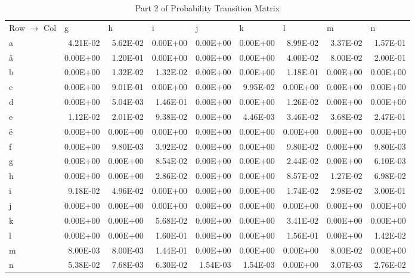 \documentclass[11pt,a4paper]{CLabBookTemplate} %
\begin{document}
\begin{table}[htbp]
	\centering
	\caption{Part 2 of Probability Transition Matrix}
	\begin{tabular}{lrrrrrrrr}
		Row $\rightarrow$ Col & \multicolumn{1}{l}{g} & \multicolumn{1}{l}{h} & \multicolumn{1}{l}{i} & \multicolumn{1}{l}{j} & \multicolumn{1}{l}{k} & \multicolumn{1}{l}{l} & \multicolumn{1}{l}{m} & \multicolumn{1}{l}{n} \\
		a     & 4.21E-02 & 5.62E-02 & 0.00E+00 & 0.00E+00 & 0.00E+00 & 8.99E-02 & 3.37E-02 & 1.57E-01 \\
		ä     & 0.00E+00 & 1.20E-01 & 0.00E+00 & 0.00E+00 & 0.00E+00 & 4.00E-02 & 8.00E-02 & 2.00E-01 \\
		b     & 0.00E+00 & 1.32E-02 & 1.32E-02 & 0.00E+00 & 0.00E+00 & 1.18E-01 & 0.00E+00 & 0.00E+00 \\
		c     & 0.00E+00 & 9.01E-01 & 0.00E+00 & 0.00E+00 & 9.95E-02 & 0.00E+00 & 0.00E+00 & 0.00E+00 \\
		d     & 0.00E+00 & 5.04E-03 & 1.46E-01 & 0.00E+00 & 0.00E+00 & 1.26E-02 & 0.00E+00 & 0.00E+00 \\
		e     & 1.12E-02 & 2.01E-02 & 9.38E-02 & 0.00E+00 & 4.46E-03 & 3.46E-02 & 3.68E-02 & 2.47E-01 \\
		ë     & 0.00E+00 & 0.00E+00 & 0.00E+00 & 0.00E+00 & 0.00E+00 & 0.00E+00 & 0.00E+00 & 0.00E+00 \\
		f     & 0.00E+00 & 9.80E-03 & 3.92E-02 & 0.00E+00 & 0.00E+00 & 9.80E-02 & 0.00E+00 & 9.80E-03 \\
		g     & 0.00E+00 & 0.00E+00 & 8.54E-02 & 0.00E+00 & 0.00E+00 & 2.44E-02 & 0.00E+00 & 6.10E-03 \\
		h     & 0.00E+00 & 0.00E+00 & 2.86E-02 & 0.00E+00 & 0.00E+00 & 8.57E-02 & 1.27E-02 & 6.98E-02 \\
		i     & 9.18E-02 & 4.96E-02 & 0.00E+00 & 0.00E+00 & 0.00E+00 & 1.74E-02 & 2.98E-02 & 3.00E-01 \\
		j     & 0.00E+00 & 0.00E+00 & 0.00E+00 & 0.00E+00 & 0.00E+00 & 0.00E+00 & 0.00E+00 & 0.00E+00 \\
		k     & 0.00E+00 & 0.00E+00 & 5.68E-02 & 0.00E+00 & 0.00E+00 & 3.41E-02 & 0.00E+00 & 0.00E+00 \\
		l     & 0.00E+00 & 0.00E+00 & 1.60E-01 & 0.00E+00 & 0.00E+00 & 1.56E-01 & 0.00E+00 & 1.42E-02 \\
		m     & 8.00E-03 & 8.00E-03 & 1.44E-01 & 0.00E+00 & 0.00E+00 & 0.00E+00 & 8.00E-02 & 0.00E+00 \\
		n     & 5.38E-02 & 7.68E-03 & 6.30E-02 & 1.54E-03 & 1.54E-03 & 0.00E+00 & 3.07E-03 & 2.76E-02 \\

\end{tabular}
\end{table}
\end{document}
